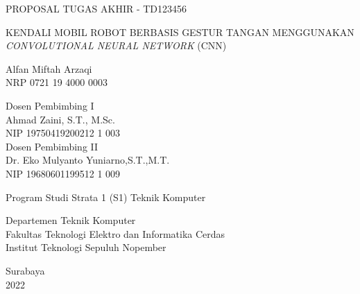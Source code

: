 \begin{large}
  PROPOSAL TUGAS AKHIR - TD123456
\end{large}

\vspace{\fill}

\begin{spacing}{1.5}
  \begin{Large}
    KENDALI MOBIL ROBOT BERBASIS GESTUR TANGAN MENGGUNAKAN \emph{CONVOLUTIONAL NEURAL NETWORK} (CNN)
  \end{Large}
\end{spacing}

\vspace{\fill}

\begin{large}
  Alfan Miftah Arzaqi \\
  \textnormal{NRP 0721 19 4000 0003}
\end{large}

\vspace{\fill}

\begin{large}
  \textnormal{Dosen Pembimbing I} \\
  Ahmad Zaini, S.T., M.Sc. \\
  \textnormal{NIP 19750419200212 1 003} \\
  \textnormal{Dosen Pembimbing II} \\
  Dr. Eko Mulyanto Yuniarno,S.T.,M.T. \\
  \textnormal{NIP 19680601199512 1 009}
\end{large}

\vspace{\fill}

Program Studi Strata 1 (S1) Teknik Komputer \\

\normalfont

Departemen Teknik Komputer \\
Fakultas Teknologi Elektro dan Informatika Cerdas \\
Institut Teknologi Sepuluh Nopember

Surabaya \\
2022
